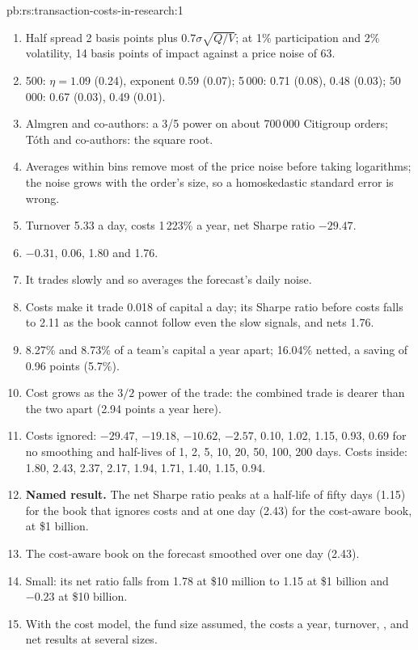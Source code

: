 \begin{solution}{pb:rs:transaction-costs-in-research:1}
\begin{enumerate}
\item Half spread 2 basis points plus $0.7\sigma\sqrt{Q/V}$; at 1\% participation and 2\% volatility, 14 basis points of impact against a price noise of 63.
\item 500: $\eta = 1.09$ (0.24), exponent 0.59 (0.07); 5\,000: 0.71 (0.08), 0.48 (0.03); 50\,000: 0.67 (0.03), 0.49 (0.01).
\item Almgren and co-authors: a 3/5 power on about 700\,000 Citigroup orders; Tóth and co-authors: the square root.
\item Averages within bins remove most of the price noise before taking logarithms; the noise grows with the order's size, so a homoskedastic standard error is
wrong.
\item Turnover 5.33 a day, costs 1\,223\% a year, net Sharpe ratio $-29.47$.
\item $-0.31$, 0.06, 1.80 and 1.76.
\item It trades slowly and so averages the forecast's daily noise.
\item Costs make it trade 0.018 of capital a day; its Sharpe ratio before costs falls to 2.11 as the book cannot follow even the slow signals, and nets 1.76.
\item 8.27\% and 8.73\% of a team's capital a year apart; 16.04\% netted, a saving of 0.96 points (5.7\%).
\item Cost grows as the $3/2$ power of the trade: the combined trade is dearer than the two apart (2.94 points a year here).
\item Costs ignored: $-29.47$, $-19.18$, $-10.62$, $-2.57$, 0.10, 1.02, 1.15, 0.93, 0.69 for no smoothing and half-lives of 1, 2, 5, 10, 20, 50, 100, 200 days. Costs
inside: 1.80, 2.43, 2.37, 2.17, 1.94, 1.71, 1.40, 1.15, 0.94.
\item \textbf{Named result.} The net Sharpe ratio peaks at a half-life of fifty days (1.15) for the book that ignores costs and at one day (2.43) for the cost-aware
book, at \$1 billion.
\item The cost-aware book on the forecast smoothed over one day (2.43).
\item Small: its net ratio falls from 1.78 at \$10 million to 1.15 at \$1 billion and $-0.23$ at \$10 billion.
\item With the cost model, the fund size assumed, the costs a year, turnover, , and net results at several sizes.

\end{enumerate}
\end{solution}
